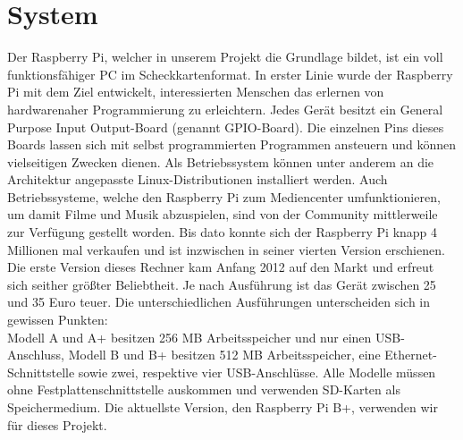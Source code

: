 \documentclass[9pt,a4paper]{IEEEtran}
\begin{document}
\section{System}
Der Raspberry Pi, welcher in unserem Projekt die Grundlage bildet, ist ein voll funktionsfähiger PC im Scheckkartenformat. 
In erster Linie wurde der Raspberry Pi mit dem Ziel entwickelt, interessierten Menschen das erlernen von hardwarenaher Programmierung zu erleichtern.
Jedes Gerät besitzt ein General Purpose Input Output-Board (genannt GPIO-Board).
Die einzelnen Pins dieses Boards lassen sich mit selbst programmierten Programmen ansteuern und können vielseitigen Zwecken dienen.
Als Betriebssystem können unter anderem an die Architektur angepasste Linux-Distributionen installiert werden. 
Auch Betriebssysteme, welche den Raspberry Pi zum Mediencenter umfunktionieren, um damit Filme und Musik abzuspielen, sind von der Community mittlerweile zur Verfügung gestellt worden.
Bis dato konnte sich der Raspberry Pi knapp 4 Millionen mal verkaufen und ist inzwischen in seiner vierten Version erschienen. \cite{verkaufszahlen}
Die erste Version dieses Rechner kam Anfang 2012 auf den Markt und erfreut sich seither größter Beliebtheit.
Je nach Ausführung ist das Gerät zwischen 25 und 35 Euro teuer. 
Die unterschiedlichen Ausführungen unterscheiden sich in gewissen Punkten: \\
Modell A und A+ besitzen 256 MB Arbeitsspeicher und nur einen USB-Anschluss, Modell B und B+ besitzen 512 MB Arbeitsspeicher, eine Ethernet-Schnittstelle sowie zwei, respektive vier USB-Anschlüsse.
Alle Modelle müssen ohne Festplattenschnittstelle auskommen und verwenden SD-Karten als Speichermedium.
Die aktuellste Version, den Raspberry Pi B+, verwenden wir für dieses Projekt.
\end{document}

